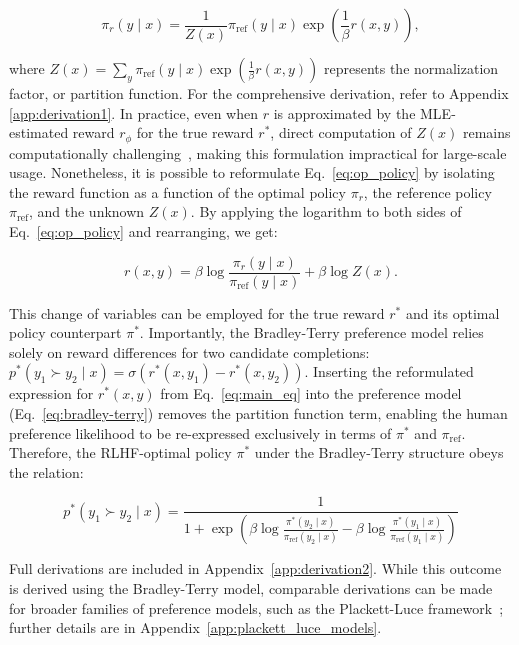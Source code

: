 \begin{equation}\label{eq:op_policy}
    \pi_r(y\mid x) = \frac{1}{Z(x)}\pi_\text{ref}(y\mid x)\exp\left(\frac{1}{\beta}r(x, y)\right),
\end{equation}

where $Z(x) = \sum_{y} \pi_\text{ref}(y\mid x) \exp\left(\frac{1}{\beta} r(x, y)\right)$ represents the normalization factor, or partition function. For the comprehensive derivation, refer to Appendix \ref{app:derivation1}. In practice, even when $r$ is approximated by the MLE-estimated reward $r_{\phi}$ for the true reward $r^*$, direct computation of $Z(x)$ remains computationally challenging~\citep{korbak2022reinforcement, go2023aligning}, making this formulation impractical for large-scale usage. Nonetheless, it is possible to reformulate Eq.~\ref{eq:op_policy} by isolating the reward function as a function of the optimal policy $\pi_r$, the reference policy $\pi_\text{ref}$, and the unknown $Z(x)$. By applying the logarithm to both sides of Eq.~\ref{eq:op_policy} and rearranging, we get:

\begin{equation}\label{eq:main_eq}
    r(x,y) = \beta \log \frac{\pi_r(y\mid x)}{\pi_\text{ref}(y\mid x)} + \beta \log Z(x).
\end{equation}

This change of variables can be employed for the true reward $r^*$ and its optimal policy counterpart $\pi^*$. Importantly, the Bradley-Terry preference model relies solely on reward differences for two candidate completions: ${p^*(y_1 \succ y_2 \mid x) = \sigma(r^*(x, y_1) - r^*(x, y_2))}$. Inserting the reformulated expression for $r^*(x, y)$ from Eq.~\ref{eq:main_eq} into the preference model (Eq.~\ref{eq:bradley-terry}) removes the partition function term, enabling the human preference likelihood to be re-expressed exclusively in terms of $\pi^*$ and $\pi_\text{ref}$. Therefore, the RLHF-optimal policy $\pi^*$ under the Bradley-Terry structure obeys the relation:

\begin{equation}\label{eq:objective}
    p^*(y_1\succ y_2 \mid x) = \frac{1}{1 + \exp\left(\beta \log \frac{\pi^*(y_2\mid x)}{\pi_\text{ref}(y_2\mid x)} - \beta \log \frac{\pi^*(y_1\mid x)}{\pi_\text{ref}(y_1\mid x)}\right)}
\end{equation}

Full derivations are included in Appendix~\ref{app:derivation2}. While this outcome is derived using the Bradley-Terry model, comparable derivations can be made for broader families of preference models, such as the Plackett-Luce framework~\citep{plackett1975analysis, luce2012individual}; further details are in Appendix~\ref{app:plackett_luce_models}.

